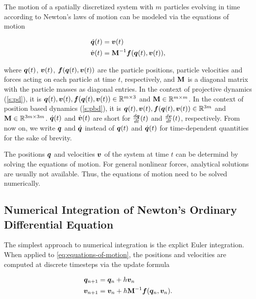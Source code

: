 The motion of a spatially discretized system with $m$ particles evolving in time according to Newton's laws of motion can be modeled via 
the equations of motion

\begin{align}
    \begin{split}\label{eq:equations-of-motion}
        \dot{\bm{q}}(t) &= \bm{v}(t) \\
        \dot{\bm{v}}(t) &= \mathbf{M}^{-1}\bm{f}(\bm{q}(t), \bm{v}(t)),
    \end{split}
\end{align}

\noindent where $\bm{q}(t)$, $\bm{v}(t)$, $\bm{f}(\bm{q}(t), \bm{v}(t))$ are the particle positions, particle velocities and 
forces acting on each particle
at time $t$, respectively, and $\mathbf{M}$ is a diagonal matrix with the particle masses as diagonal entries. In the context of 
projective dynamics (\cref{s:pd}), it is
$\bm{q}(t), \bm{v}(t), \bm{f}(\bm{q}(t), \bm{v}(t)) \in \mathbb{R}^{m \times 3}$ and $\mathbf{M} \in \mathbb{R}^{m \times m}$. 
In the context of position based dynamics (\cref{s:pbd}), it is $\bm{q}(t), \bm{v}(t), \bm{f}(\bm{q}(t), \bm{v}(t)) \in \mathbb{R}^{3m}$ and $\mathbf{M} 
\in \mathbb{R}^{3m \times 3m}$. $\dot{\bm{q}}(t)$ and $\dot{\bm{v}}(t)$ are short for $\frac{d\bm{q}}{dt}(t)$ and
$\frac{d\bm{v}}{dt}(t)$, respectively. From now on, we write $\bm{q}$ and $\dot{\bm{q}}$ instead of $\bm{q}(t)$ and $\dot{\bm{q}}(t)$ for 
time-dependent quantities for the sake of brevity.

The positions $\bm{q}$ and velocities $\bm{v}$ of the system at time $t$ can be determind by solving the equations of motion. For general 
nonlinear forces, analytical solutions are usually not available. Thus, the equations of motion need to be solved numerically.

\subsection{Numerical Integration of Newton's Ordinary Differential Equation}\label{s:numerical-integration}
The simplest approach to numerical integration is the explict Euler integration. When applied to \autoref{eq:equations-of-motion}, 
the positions and velocities are computed at discrete timesteps via the update formula

\begin{align*}
    \bm{q}_{n+1} &= \bm{q}_n + h\bm{v}_n\\
    \bm{v}_{n+1} &= \bm{v}_n + h\mathbf{M}^{-1}\bm{f}(\bm{q}_n, \bm{v}_n).
\end{align*}

